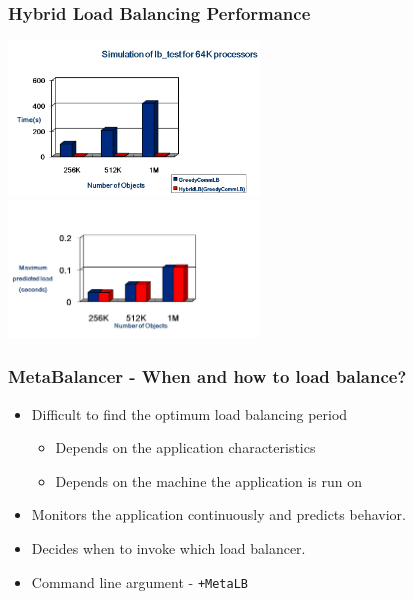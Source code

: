 \begin{frame}[fragile]
\frametitle{Hybrid Load Balancing Performance}
\includegraphics[width=0.5\textwidth]{figures/hybridLBPerf}
\includegraphics[width=0.5\textwidth]{figures/hybridLBquality}
\end{frame}

\begin{frame}[fragile]
\frametitle{MetaBalancer - When and how to load balance?}
\begin{itemize}    
    \item Difficult to find the optimum load balancing period
    \begin{itemize}
       \item Depends on the application characteristics
       \item Depends on the machine the application is run on
    \end{itemize}
    
    \item Monitors the application continuously and predicts behavior.
    \item Decides when to invoke which load balancer.
    \item Command line argument - \texttt{+MetaLB}
\end{itemize}
\end{frame}


